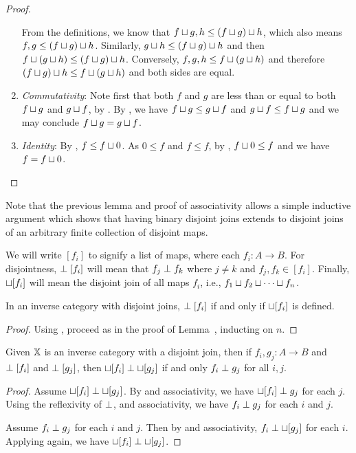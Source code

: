 \begin{proof}
\begin{enumerate}[{(}i{)}]
      From the definitions, we know that $f\sqcup g, h \le (f\sqcup g)\sqcup h$, which also means
      $f, g \le (f\sqcup g)\sqcup h$. Similarly, $g\sqcup h \le (f\sqcup g)\sqcup h $ and then $f
      \sqcup (g\sqcup h)\le (f\sqcup g)\sqcup h$. Conversely, $f,g,h \le f \sqcup (g\sqcup h)$ and
      therefore $(f\sqcup g)\sqcup h \le f \sqcup (g\sqcup h)$ and both sides are equal.
    \item \emph{Commutativity}: Note first that both $f$ and $g$ are less than or equal to both
      $f\sqcup g$ and $g \sqcup f$, by . By , we have $f \sqcup g \le
      g\sqcup f$ and $g\sqcup f \le f \sqcup g$ and we may conclude $f \sqcup g = g \sqcup f$.
    \item \emph{Identity}: By , $f \le f \sqcup 0$. As $0 \le f$ and $f \le f$, by
      , $f \sqcup 0 \le f$ and we have $f = f \sqcup 0$.
  \end{enumerate}
\end{proof}

Note that the previous lemma and proof of associativity allows a simple inductive argument which
shows that having binary disjoint joins extends to disjoint joins of an arbitrary
finite collection of disjoint maps.

We will write $[f_i]$ to signify a list of maps, where each $f_i: A \to B$. For disjointness,
$\perp [f_i]$ will mean that $f_j \perp f_k$ where $j\ne k$ and $f_j, f_k \in [f_i]$. Finally,
$\sqcup [f_i]$ will mean the disjoint join of all maps $f_i$, i.e.,
$f_1 \sqcup f_2 \sqcup \cdots \sqcup f_n$.

\begin{lemma}\label{lem:arbitrary_disjoint_joins}
  In an inverse category with disjoint joins, $\perp [f_i]$ if and only if
  $\sqcup [f_i]$ is defined.
\end{lemma}
\begin{proof}
  Using , proceed as in the proof of
  Lemma~,
  inducting on $n$.
\end{proof}


\begin{lemma}\label{lem:disjoint_joins_only_when_all_disjoint}
  Given $\mathbb{X}$ is an inverse category with a disjoint join, then if $f_i, g_j : A \to B$ and $\perp
  [f_i]$ and $\perp [g_j]$, then $\sqcup [f_i] \perp \sqcup [g_j]$ if and only $f_i \perp
  g_j$ for all $i,j$.
\end{lemma}
\begin{proof}
  Assume $\sqcup [f_i] \perp \sqcup [g_j]$. By  and associativity, we have
  $\sqcup [f_i] \perp g_j$ for each $j$. Using the reflexivity of $\perp$,
   and associativity, we have $f_i \perp g_j$ for each $i$ and $j$.

  Assume $f_i \perp g_j$ for each $i$ and $j$. Then by  and associativity, $f_i
  \perp \sqcup [g_j]$ for each $i$. Applying  again, we have $\sqcup [f_i] \perp
  \sqcup [g_j]$.
\end{proof}

